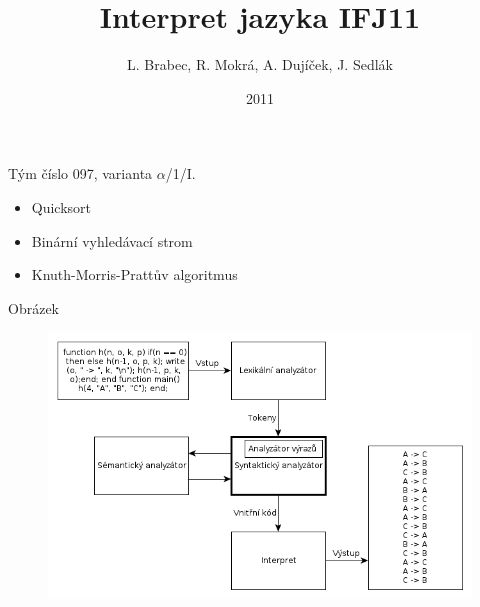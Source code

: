 \documentclass{beamer}
\title[Interpret jazyka IFJ11]{Interpret jazyka IFJ11}
\institute{FIT VUT Brno}
\author{~~L. Brabec, R. Mokrá, A. Dujíček, J. Sedlák~~\\}
\date{2011}
\begin{document}
\begin{frame}
  \maketitle
\end{frame}

\begin{frame}
  Tým číslo 097, varianta $\alpha$/1/I.
  \begin{itemize}
  \item Quicksort
  \item Binární vyhledávací strom
  \item Knuth-Morris-Prattův algoritmus
  \end{itemize}
\end{frame}

\begin{frame}{Obrázek}
  \begin{figure}
    \includegraphics[scale=0.45]{schema.png}
  \end{figure}
\end{frame}
\end{document}
